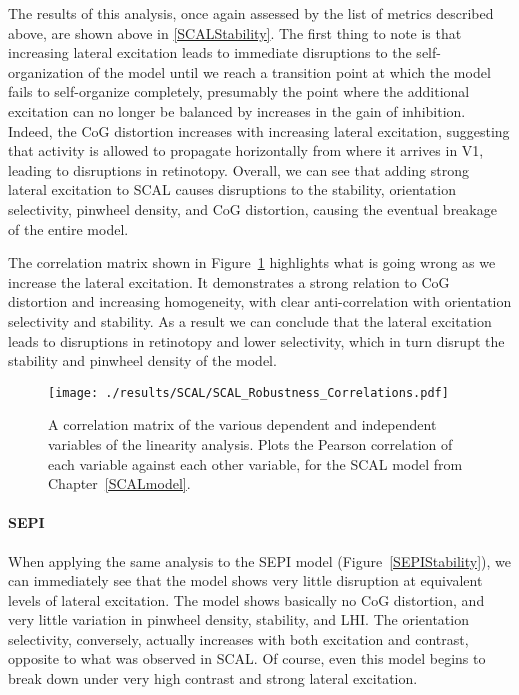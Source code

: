 The results of this analysis, once again assessed by the list of
metrics described above, are shown above in \ref{SCALStability}. The
first thing to note is that increasing lateral excitation leads to
immediate disruptions to the self-organization of the model until we
reach a transition point at which the model fails to self-organize
completely, presumably the point where the additional excitation can
no longer be balanced by increases in the gain of inhibition. Indeed,
the CoG distortion increases with increasing lateral excitation,
suggesting that activity is allowed to propagate horizontally from
where it arrives in V1, leading to disruptions in retinotopy. Overall,
we can see that adding strong lateral excitation to SCAL causes
disruptions to the stability, orientation selectivity, pinwheel
density, and CoG distortion, causing the eventual breakage of the
entire model.

The correlation matrix shown in Figure~\ref{SCALRobustnessCorr}
highlights what is going wrong as we increase the lateral
excitation. It demonstrates a strong relation to CoG distortion and
increasing homogeneity, with clear anti-correlation with orientation
selectivity and stability. As a result we can conclude that the
lateral excitation leads to disruptions in retinotopy and lower
selectivity, which in turn disrupt the stability and pinwheel density
of the model.

\begin{figure}
	\centering
    \texttt{[image: ./results/SCAL/SCAL\_Robustness\_Correlations.pdf]}
	\caption{A correlation matrix of the various dependent and
      independent variables of the linearity analysis. Plots the
      Pearson correlation of each variable against each other
      variable, for the SCAL model from Chapter~\ref{SCALmodel}.}
	\label{SCALRobustnessCorr}
\end{figure}

\paragraph{SEPI}

When applying the same analysis to the SEPI model
(Figure~\ref{SEPIStability}), we can immediately see that the model
shows very little disruption at equivalent levels of lateral
excitation.  The model shows basically no CoG distortion, and very
little variation in pinwheel density, stability, and LHI. The
orientation selectivity, conversely, actually increases with both
excitation and contrast, opposite to what was observed in SCAL. Of
course, even this model begins to break down under very high contrast
and strong lateral excitation.

